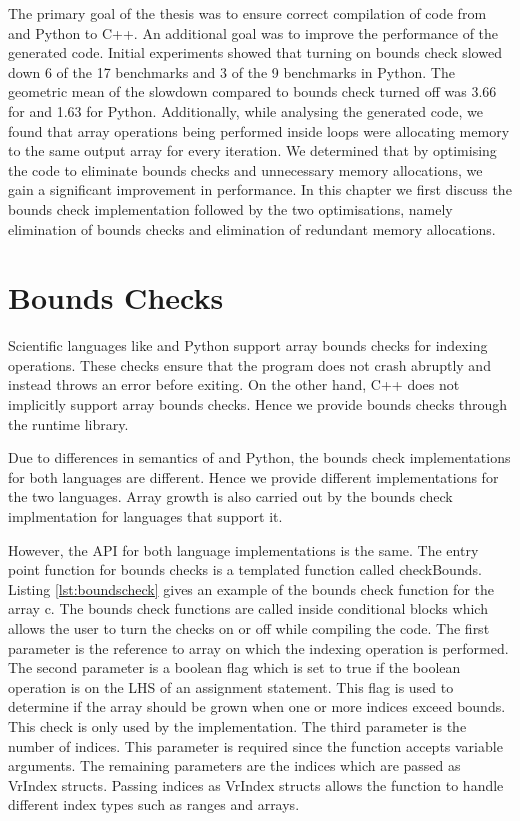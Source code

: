 The primary goal of the thesis was to ensure correct compilation of code from \matlab and Python to C++. An additional goal was to improve the performance of the generated code. Initial experiments showed that turning on bounds check slowed down 6 of the 17 benchmarks and 3 of the 9 benchmarks in Python. The geometric mean of the slowdown compared to bounds check turned off was 3.66 for \matlab and 1.63 for Python. Additionally, while analysing the generated code, we found that array operations being performed inside loops were allocating memory to the same output array for every iteration. We determined that by optimising the code to eliminate bounds checks and unnecessary memory allocations, we gain a significant improvement in performance. In this chapter we first discuss the bounds check implementation followed by the two optimisations, namely elimination of bounds checks and elimination of redundant memory allocations. 

\section{Bounds Checks}
Scientific languages like \matlab and Python support array bounds checks for indexing operations. These checks ensure that the program does not crash abruptly and instead throws an error before exiting. On the other hand, C++ does not implicitly support array bounds checks. Hence we provide bounds checks through the runtime library.

Due to differences in semantics of \matlab and Python, the bounds check implementations for both languages are different. Hence we provide different implementations for the two languages. Array growth is also carried out by the bounds check implmentation for languages that support it. 

However, the API for both language implementations is the same. The entry point function for bounds checks is a templated function called \textsf{checkBounds}. Listing \ref{lst:boundscheck} gives an example of the bounds check function for the array \textsf{c}. The bounds check functions are called inside conditional blocks which allows the user to turn the checks on or off while compiling the code. The first parameter is the reference to array on which the indexing operation is performed. The second parameter is a boolean flag which is set to true if the boolean operation is on the LHS of an assignment statement. This flag is used to determine if the array should be grown when one or more indices exceed bounds. This check is only used by the \matlab implementation. The third parameter is the number of indices. This parameter is required since the function accepts variable arguments. The remaining parameters are the indices which are passed as VrIndex structs. Passing indices as VrIndex structs allows the function to handle different index types such as ranges and arrays.

